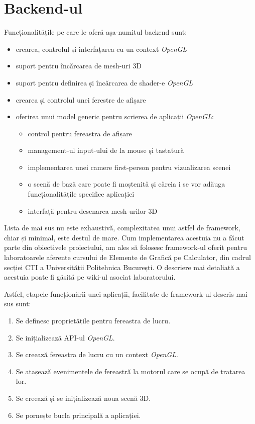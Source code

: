 \documentclass[12pt,a4paper]{report}
\begin{document}
\section{Backend-ul}

Funcționalitățile pe care le oferă așa-numitul backend sunt:
\begin{itemize}
	\item crearea, controlul și interfațarea cu un context \textit{OpenGL}
	\item suport pentru încărcarea de mesh-uri 3D
	\item suport pentru definirea și încărcarea de shader-e \textit{OpenGL}
	\item crearea și controlul unei ferestre de afișare
	\item oferirea unui model generic pentru scrierea de aplicații \textit{OpenGL}:
		\begin{itemize}
			\item control pentru fereastra de afișare
			\item management-ul input-ului de la mouse și tastatură
			\item implementarea unei camere first-person pentru vizualizarea scenei
			\item o scenă de bază care poate fi moștenită și căreia i se vor adăuga funcționalitățile specifice aplicației
			\item interfață pentru desenarea mesh-urilor 3D
		\end{itemize}
\end{itemize}
Lista de mai sus nu este exhaustivă, complexitatea unui astfel de framework, chiar și minimal, este destul de mare. Cum implementarea acestuia nu a făcut parte din obiectivele proiectului, am ales să folosesc framework-ul\cite{framework_egc_github} oferit pentru laboratoarele aferente cursului de Elemente de Grafică pe Calculator, din cadrul secției CTI a Universității Politehnica București. O descriere mai detaliată a acestuia poate fi găsită pe wiki-ul asociat laboratorului\cite{framework_egc_ocw}.

Astfel, etapele funcționării unei aplicații, facilitate de framework-ul descris mai sus sunt:
\begin{enumerate}
	\item Se definesc proprietățile pentru fereastra de lucru.
	\item Se inițializează API-ul \textit{OpenGL}.
	\item Se creează fereastra de lucru cu un context \textit{OpenGL}.
	\item Se atașează evenimentele de fereastră la motorul care se ocupă de tratarea lor.
	\item Se creează și se inițializează noua scenă 3D.
	\item Se pornește bucla principală a aplicației.
\end{enumerate}
\end{document}
